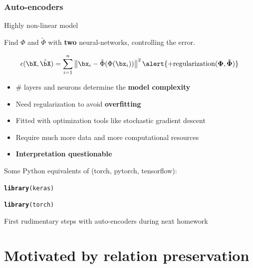 \documentclass{beamer}\usepackage[]{graphicx}\usepackage[]{color}
\makeatletter
\newcommand{\hlstd}[1]{\textcolor[rgb]{0.345,0.345,0.345}{#1}}%
\newcommand{\hlkwd}[1]{\textcolor[rgb]{0.737,0.353,0.396}{\textbf{#1}}}%
\newenvironment{kframe}{%
 \def\at@end@of@kframe{}%
 \ifinner\ifhmode%
  \def\at@end@of@kframe{\end{minipage}}%
  \begin{minipage}{\columnwidth}%
 \fi\fi%
 \def\FrameCommand##1{\hskip\@totalleftmargin \hskip-\fboxsep
 \colorbox{shadecolor}{##1}\hskip-\fboxsep
     \hskip-\linewidth \hskip-\@totalleftmargin \hskip\columnwidth}%
 \MakeFramed {\advance\hsize-\width
   \@totalleftmargin\z@ \linewidth\hsize
   \@setminipage}}%
 {\par\unskip\endMakeFramed%
 \at@end@of@kframe}
\newenvironment{knitrout}{}{} %
\makeatother
\begin{document}
\begin{frame}
   \frametitle{Auto-encoders}
   
   \begin{block}{Highly non-linear model}

      Find $\Phi$ and $\tilde\Phi$ with \alert{\bf two} neural-networks, controlling the error.

      \begin{equation*}
        \epsilon(\bX, \hat \bX ) = \sum_{i=1}^n \left\| \bx_i - \tilde{\Phi}(\Phi(\bx_i)) \right\|^2 \alert{\bf + \text{regularization}(\Phi, \tilde\Phi)}
      \end{equation*}

      \begin{itemize}
         \item \# layers and neurons determine the \alert{\bf model complexity}
         \item Need regularization to avoid \alert{\bf overfitting}
         \item  Fitted with optimization tools like stochastic gradient descent
         \item Require much \alert{more data} and more computational \alert{resources}
         \item \alert{\bf Interpretation questionable}
      \end{itemize}

   \end{block}

Some Python equivalents of (torch, pytorch, tensorflow):
 
\begin{knitrout}\scriptsize
{}\color{fgcolor}\begin{kframe}
\begin{alltt}
\hlkwd{library}\hlstd{(keras)}

\hlkwd{library}\hlstd{(torch)}
\end{alltt}
\end{kframe}
\end{knitrout}

\rsa First rudimentary steps with auto-encoders during next homework

\end{frame}


\section{Motivated by relation preservation}
\end{document}

